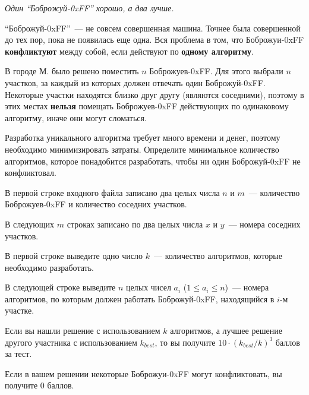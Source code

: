 
\Legend
\textit{Один ``Боброжуй-0xFF'' хорошо, а два лучше.}

``Боброжуй-0xFF''~--- не совсем совершенная машина. Точнее была совершенной до тех пор, пока не появилась
еще одна. Вся проблема в том, что Боброжуи-0xFF \textbf{конфликтуют} между собой, если действуют по
\textbf{одному алгоритму}.

В городе М. было решено поместить $n$ Боброжуев-0xFF. Для этого выбрали $n$ участков, за каждый из которых
должен отвечать один Боброжуй-0xFF. Некоторые участки находятся близко друг другу (являются соседними),
поэтому в этих местах \textbf{нельзя} помещать Боброжуев-0xFF действующих по одинаковому алгоритму, иначе они
могут сломаться.

Разработка уникального алгоритма требует много времени и денег, поэтому необходимо минимизировать затраты.
Определите минимальное количество алгоритмов, которое понадобится разработать, чтобы ни один Боброжуй-0xFF
не конфликтовал.

\Input
В первой строке входного файла записано два целых числа $n$ и $m$~--- количество Боброжуев-0xFF и количество
соседних участков.

В следующих $m$ строках записано по два целых числа $x$ и $y$~--- номера соседних участков.

\Output
В первой строке выведите одно число $k$~--- количество алгоритмов, которые необходимо разработать.

В следующей строке выведите $n$ целых чисел $a_i$ ($1 \le a_i \le n$)~--- номера алгоритмов, по которым должен
работать Боброжуй-0xFF, находящийся в $i$-м участке.

\Samples
\BeginTests
{}
\EndTests

\Scoring
Если вы нашли решение с использованием $k$ алгоритмов, а лучшее решение другого участника с использованием
$k_{best}$, то вы получите $10 \cdot (k_{best}/k)^3$ баллов за тест.

Если в вашем решении некоторые Боброжуи-0xFF могут конфликтовать, вы получите $0$ баллов.

\EndProblem
